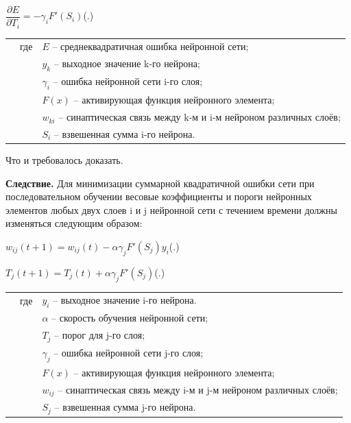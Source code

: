 {	\formulaspace \par \redline 
	$\dfrac{\partial E}{\partial T_{i}} =  - \gamma_{i}F'(S_{i})$\hfill (\thechaptercntr .\theformulacntr) \redline
	\formulaspace \addtocounter{formulacntr}{1}
	
	\begin{tabular}{p{}p{}p{}}
		& где  & $E$ {--} среднеквадратичная ошибка нейронной сети; \\
		&      & $y_{k}$ {--} выходное значение k-го нейрона; \\
		&      & $\gamma_{i}$ {--} ошибка нейронной сети i-го слоя; \\
		&      & $F(x)$ {--} активирующая функция нейронного элемента; \\
		&      & $w_{ki}$ {--} синаптическая связь между k-м и i-м нейроном различных слоёв; \\
		&      & $S_{i}$ {--} взвешенная сумма i-го нейрона. \\
	\end{tabular}
	
	\par \redline Что и требовалось доказать.
	
	\par \redline \textbf{Следствие.}  Для минимизации суммарной квадратичной ошибки сети при последовательном обучении весовые коэффициенты и пороги нейронных элементов любых двух слоев i и j нейронной сети с течением времени должны изменяться следующим образом:
	
	\formulaspace \par \redline 
	$w_{ij}(t+1) = w_{ij}(t) - \alpha \gamma_{j} F'(S_{j}) y_{i} $\hfill (\thechaptercntr .\theformulacntr) \redline
	\formulaspace \addtocounter{formulacntr}{1}
	
	\formulaspace \par \redline 
	$T_{j}(t+1) = T_{j}(t) + \alpha \gamma_{j} F'(S_{j}) $\hfill (\thechaptercntr .\theformulacntr) \redline
	\formulaspace \addtocounter{formulacntr}{1}
	
	\begin{tabular}{p{}p{}p{}}
		& где  & $y_{i}$ {--} выходное значение i-го нейрона. \\
		&      & $\alpha$ {--} скорость обучения нейронной сети; \\
		&      & $T_{j}$ {--} порог для j-го слоя; \\
		&      & $\gamma_{j}$ {--} ошибка нейронной сети j-го слоя; \\
		&      & $F(x)$ {--} активирующая функция нейронного элемента; \\
		&      & $w_{ij}$ {--} синаптическая связь между i-м и j-м нейроном различных слоёв; \\
		&      & $S_{j}$ {--} взвешенная сумма j-го нейрона. \\
	\end{tabular}
	
}
